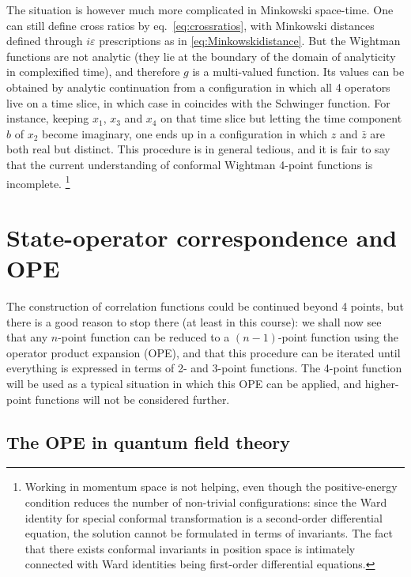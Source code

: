 \documentclass[a4paper,12pt]{article}
\numberwithin{equation}{section}
\begin{document}
The situation is however much more complicated in Minkowski space-time. One can still define cross ratios by eq.~\eqref{eq:crossratios}, with Minkowski distances defined through $i \varepsilon$ prescriptions as in \eqref{eq:Minkowskidistance}. But the Wightman functions are not analytic (they lie at the boundary of the domain of analyticity in complexified time), and therefore $g$ is a multi-valued function. Its values can be obtained by analytic continuation from a configuration in which all 4 operators live on a time slice, in which case in coincides with the Schwinger function. For instance, keeping $x_1$, $x_3$ and $x_4$ on that time slice but letting the time component $b$ of $x_2$ become imaginary, one ends up in a configuration in which $z$ and $\bar{z}$ are both real but distinct. This procedure is in general tedious, and it is fair to say that the current understanding of conformal Wightman 4-point functions is incomplete.%
%
\footnote{Working in momentum space is not helping, even though the positive-energy condition reduces the number of non-trivial configurations: since the Ward identity for special conformal transformation is a second-order differential equation, the solution cannot be formulated in terms of invariants. The fact that there exists conformal invariants in position space is intimately connected with Ward identities being first-order differential equations.}



\section{State-operator correspondence and OPE}
\label{sec:OPE}

The construction of correlation functions could be continued beyond 4 points, but there is a good reason to stop there (at least in this course): we shall now see that any $n$-point function can be reduced to a $(n-1)$-point function using the operator product expansion (OPE), and that this procedure can be iterated until everything is expressed in terms of 2- and 3-point functions. The 4-point function will be used as a typical situation in which this OPE can be applied, and higher-point functions will not be considered further.


\subsection{The OPE in quantum field theory}
\end{document}
